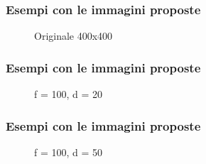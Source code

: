 \documentclass{beamer}
\begin{document}
\begin{frame}
	\frametitle{Esempi con le immagini proposte}
	\begin{figure}
		\caption{Originale 400x400}
	\end{figure}	
\end{frame}

\begin{frame}
	\frametitle{Esempi con le immagini proposte}
	\begin{figure}
		\caption{f = 100, d = 20}
	\end{figure}	
\end{frame}

\begin{frame}
	\frametitle{Esempi con le immagini proposte}
	\begin{figure}
		\caption{f = 100, d = 50}
	\end{figure}	
\end{frame}
\end{document}
